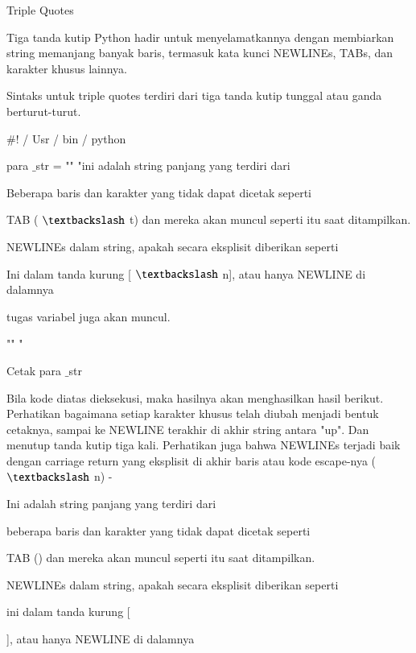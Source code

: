 \documentclass[a4paper,12pt]{report}
\begin{document}
\noindent 
\vspace{12pt}
\noindent 
Triple Quotes \par
\noindent 
\vspace{12pt}
\noindent 
Tiga tanda kutip Python hadir untuk menyelamatkannya dengan membiarkan string memanjang banyak baris, termasuk kata kunci NEWLINEs, TABs, dan karakter khusus lainnya. \par
\noindent 
Sintaks untuk triple quotes terdiri dari tiga tanda kutip tunggal atau ganda berturut-turut. \par
\noindent 
 $  \#  $! / Usr / bin / python \par
\noindent 
\vspace{12pt}
\noindent 
para $  \_  $str = "" "ini adalah string panjang yang terdiri dari \par
\noindent 
Beberapa baris dan karakter yang tidak dapat dicetak seperti \par
\noindent 
TAB ( $  \textbackslash  $ t) dan mereka akan muncul seperti itu saat ditampilkan. \par
\noindent 
NEWLINEs dalam string, apakah secara eksplisit diberikan seperti \par
\noindent 
Ini dalam tanda kurung [ $  \textbackslash  $ n], atau hanya NEWLINE di dalamnya \par
\noindent 
tugas variabel juga akan muncul. \par
\noindent 
"" " \par
\noindent 
Cetak para $  \_  $str \par
\noindent 
Bila kode diatas dieksekusi, maka hasilnya akan menghasilkan hasil berikut. Perhatikan bagaimana setiap karakter khusus telah diubah menjadi bentuk cetaknya, sampai ke NEWLINE terakhir di akhir string antara "up". Dan menutup tanda kutip tiga kali. Perhatikan juga bahwa NEWLINEs terjadi baik dengan carriage return yang eksplisit di akhir baris atau kode escape-nya ( $  \textbackslash  $ n) - \par
\noindent 
Ini adalah string panjang yang terdiri dari \par
\noindent 
beberapa baris dan karakter yang tidak dapat dicetak seperti \par
\noindent 
TAB () dan mereka akan muncul seperti itu saat ditampilkan. \par
\noindent 
NEWLINEs dalam string, apakah secara eksplisit diberikan seperti \par
\noindent 
ini dalam tanda kurung [ \par
\noindent 
 $  $], atau hanya NEWLINE di dalamnya \par
\end{document}
